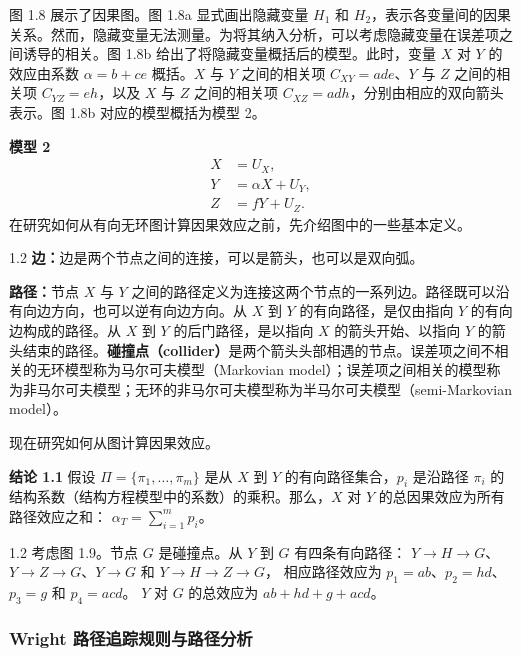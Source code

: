 图 1.8 展示了因果图。图 1.8a 显式画出隐藏变量 $H_1$ 和 $H_2$，表示各变量间的因果关系。然而，隐藏变量无法测量。为将其纳入分析，可以考虑隐藏变量在误差项之间诱导的相关。图 1.8b 给出了将隐藏变量概括后的模型。此时，变量 $X$ 对 $Y$ 的效应由系数 $\alpha=b+ce$ 概括。$X$ 与 $Y$ 之间的相关项 $C_{XY}=ade$、$Y$ 与 $Z$ 之间的相关项 $C_{YZ}=eh$，以及 $X$ 与 $Z$ 之间的相关项 $C_{XZ}=adh$，分别由相应的双向箭头表示。图 1.8b 对应的模型概括为模型 2。

\noindent\textbf{模型 2}
\[
\begin{aligned}
X&=U_X,\\
Y&=\alpha X+U_Y,\\
Z&=fY+U_Z.
\end{aligned}
\]
在研究如何从有向无环图计算因果效应之前，先介绍图中的一些基本定义。

\begin{bookdefinition}{1.2}
\textbf{边：}边是两个节点之间的连接，可以是箭头，也可以是双向弧。

\textbf{路径：}节点 $X$ 与 $Y$ 之间的路径定义为连接这两个节点的一系列边。路径既可以沿有向边方向，也可以逆有向边方向。从 $X$ 到 $Y$ 的有向路径，是仅由指向 $Y$ 的有向边构成的路径。从 $X$ 到 $Y$ 的后门路径，是以指向 $X$ 的箭头开始、以指向 $Y$ 的箭头结束的路径。\textbf{碰撞点（collider）}是两个箭头头部相遇的节点。误差项之间不相关的无环模型称为马尔可夫模型（Markovian model）；误差项之间相关的模型称为非马尔可夫模型；无环的非马尔可夫模型称为半马尔可夫模型（semi-Markovian model）。
\end{bookdefinition}

现在研究如何从图计算因果效应。

\medskip\noindent\textbf{结论 1.1}\quad
假设 $\Pi=\{\pi_1,\ldots,\pi_m\}$ 是从 $X$ 到 $Y$ 的有向路径集合，$p_i$ 是沿路径 $\pi_i$ 的结构系数（结构方程模型中的系数）的乘积。那么，$X$ 对 $Y$ 的总因果效应为所有路径效应之和：
$\alpha_T=\sum_{i=1}^mp_i$。
\par\medskip

\begin{bookexample}{1.2}
考虑图 1.9。节点 $G$ 是碰撞点。从 $Y$ 到 $G$ 有四条有向路径：
$Y\to H\to G$、$Y\to Z\to G$、$Y\to G$ 和 $Y\to H\to Z\to G$，
相应路径效应为 $p_1=ab$、$p_2=hd$、$p_3=g$ 和 $p_4=acd$。
$Y$ 对 $G$ 的总效应为 $ab+hd+g+acd$。
\end{bookexample}


\FloatBarrier

\subsubsection{Wright 路径追踪规则与路径分析}

